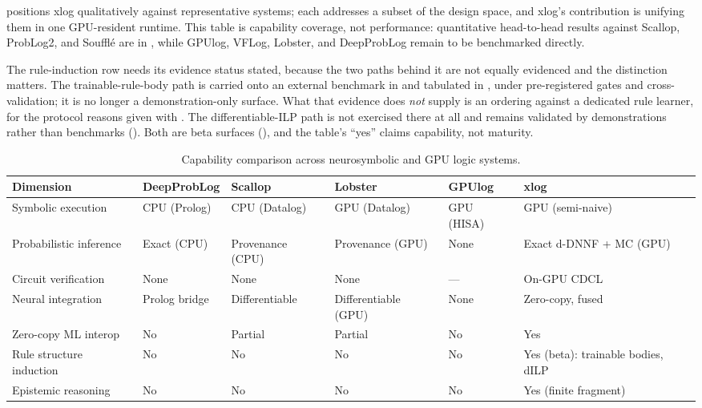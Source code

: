  positions xlog qualitatively against representative systems; each addresses a subset of the design space, and xlog's contribution is unifying them in one GPU-resident runtime. This table is capability coverage, not performance: quantitative head-to-head results against Scallop, ProbLog2, and Soufflé are in , while GPUlog, VFLog, Lobster, and DeepProbLog remain to be benchmarked directly.

The rule-induction row needs its evidence status stated, because the two paths behind it are not equally evidenced and the distinction matters. The trainable-rule-body path is carried onto an external benchmark in  and tabulated in , under pre-registered gates and cross-validation; it is no longer a demonstration-only surface. What that evidence does \emph{not} supply is an ordering against a dedicated rule learner, for the protocol reasons given with . The differentiable-ILP path is not exercised there at all and remains validated by demonstrations rather than benchmarks (). Both are beta surfaces (), and the table's ``yes'' claims capability, not maturity.

\begin{table}[htbp]
  \centering
  \caption{Capability comparison across neurosymbolic and GPU logic systems.}
  \label{tab:comparison}
  \small
  \begin{tabularx}{\linewidth}{@{}l L L L L L@{}}
    \toprule
    \textbf{Dimension} & \textbf{DeepProbLog} & \textbf{Scallop} & \textbf{Lobster} & \textbf{GPUlog} & \textbf{xlog} \\
    \midrule
    Symbolic execution      & CPU (Prolog) & CPU (Datalog)    & GPU (Datalog)      & GPU (HISA) & GPU (semi-naive) \\
    Probabilistic inference & Exact (CPU)  & Provenance (CPU) & Provenance (GPU)   & None       & Exact d-DNNF + MC (GPU) \\
    Circuit verification    & None         & None             & None               & ---        & On-GPU CDCL \\
    Neural integration      & Prolog bridge & Differentiable  & Differentiable (GPU) & None     & Zero-copy, fused \\
    Zero-copy ML interop    & No           & Partial          & Partial            & No         & Yes \\
    Rule structure induction & No          & No               & No                 & No         & Yes (beta): trainable bodies, dILP \\
    Epistemic reasoning     & No           & No               & No                 & No         & Yes (finite fragment) \\
    \bottomrule
  \end{tabularx}
\end{table}

